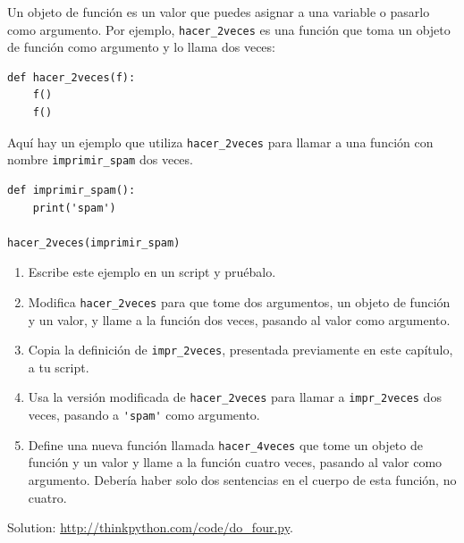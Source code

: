 \documentclass[10pt]{book}
\begin{document}
\begin{exercise}

Un objeto de función es un valor que puedes asignar a una variable o
pasarlo como argumento.  Por ejemplo, \verb"hacer_2veces" es una función
que toma un objeto de función como argumento y lo llama dos veces:

\begin{verbatim}
def hacer_2veces(f):
    f()
    f()
\end{verbatim}

Aquí hay un ejemplo que utiliza \verb"hacer_2veces" para llamar a una función
con nombre \verb"imprimir_spam" dos veces.

\begin{verbatim}
def imprimir_spam():
    print('spam')

hacer_2veces(imprimir_spam)
\end{verbatim}

\begin{enumerate}

\item Escribe este ejemplo en un script y pruébalo.

\item Modifica \verb"hacer_2veces" para que tome dos argumentos, un
objeto de función y un valor, y llame a la función dos veces,
pasando al valor como argumento.

\item Copia la definición de
\verb"impr_2veces", presentada previamente en este capítulo, a tu script.

\item Usa la versión modificada de \verb"hacer_2veces" para llamar a
\verb"impr_2veces" dos veces, pasando a \verb"'spam'" como argumento.

\item Define una nueva función llamada
\verb"hacer_4veces" que tome un objeto de función y un valor
y llame a la función cuatro veces, pasando al valor
como argumento.  Debería haber solo
dos sentencias en el cuerpo de esta función, no cuatro.

\end{enumerate}

Solution: \url{http://thinkpython.com/code/do_four.py}.

\end{exercise}
\end{document}
